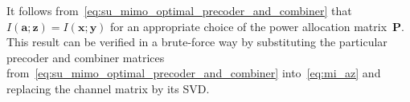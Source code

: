 It follows from~\eqref{eq:su_mimo_optimal_precoder_and_combiner} that $I(\mathbf{a}; \mathbf{z}) = I(\mathbf{x}; \mathbf{y})$ for an appropriate choice of the power allocation matrix~$\mathbf{P}$.
This result can be verified in a brute-force way by substituting the particular precoder and combiner matrices from~\eqref{eq:su_mimo_optimal_precoder_and_combiner} into~\eqref{eq:mi_az} and replacing the channel matrix by its \ac{SVD}.

